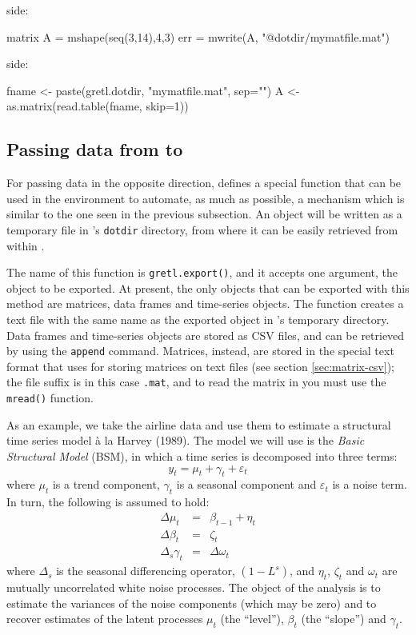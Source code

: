  side:
\begin{code}
  matrix A = mshape(seq(3,14),4,3)
  err = mwrite(A, "@dotdir/mymatfile.mat")
\end{code}
 side:
\begin{code}
  fname <- paste(gretl.dotdir, "mymatfile.mat", sep="")
  A <- as.matrix(read.table(fname, skip=1))
\end{code}

\subsection{Passing data from  to }

For passing data in the opposite direction,  defines a
special function that can be used in the  environment to
automate, as much as possible, a mechanism which is similar to the one
seen in the previous subsection. An  object will be written as
a temporary file in 's \texttt{dotdir} directory, from
where it can be easily retrieved from within .

The name of this function is \texttt{gretl.export()}, and it accepts
one argument, the object to be exported. At present, the only objects
that can be exported with this method are matrices, data frames and
time-series objects. The function creates a text file with the same
name as the exported object in 's temporary directory. Data
frames and time-series objects are stored as CSV files, and can be
retrieved by using the \texttt{append} command. Matrices, instead, are
stored in the special text format that  uses for storing
matrices on text files (see section \ref{sec:matrix-csv}); the file
suffix is in this case \texttt{.mat}, and to read the matrix in
 you must use the \texttt{mread()} function.

As an example, we take the airline data and use them to estimate a
structural time series model \`a la Harvey (1989). The model we will 
use is the \emph{Basic Structural Model} (BSM), in which a time series
is decomposed into three terms:
\[
  y_t = \mu_t + \gamma_t + \varepsilon_t
\]
where $\mu_t$ is a trend component, $\gamma_t$ is a seasonal component
and $\varepsilon_t$ is a noise term. In turn, the following is assumed
to hold:
\begin{eqnarray*}
  \Delta \mu_t & = & \beta_{t-1} + \eta_t \\
  \Delta \beta_t & = & \zeta_t \\
  \Delta_s \gamma_t & = & \Delta \omega_t
\end{eqnarray*}
where $\Delta_s$ is the seasonal differencing operator, $(1-L^s)$, and
$\eta_t$, $\zeta_t$ and $\omega_t$ are mutually uncorrelated white
noise processes. The object of the analysis is to estimate the
variances of the noise components (which may be zero) and to recover
estimates of the latent processes $\mu_t$ (the ``level''), $\beta_t$
(the ``slope'') and $\gamma_t$.

